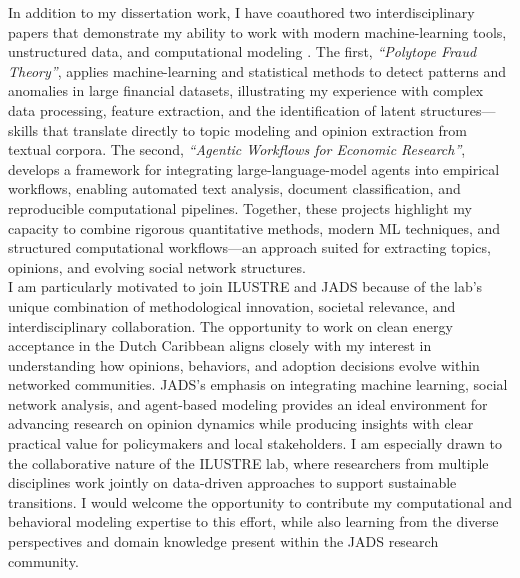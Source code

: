 \documentclass{nfr}
\begin{document}
In addition to my dissertation work, I have coauthored two interdisciplinary papers that demonstrate my ability to work with modern machine-learning tools, unstructured data, and computational modeling \citep{Zhao2025, Dawid2025}. 
The first, \textit{“Polytope Fraud Theory”}, applies machine-learning and statistical methods to detect patterns and anomalies in large financial datasets, illustrating my experience with complex data processing, feature extraction, and the identification of latent structures—skills that translate directly to topic modeling and opinion extraction from textual corpora. 
The second, \textit{“Agentic Workflows for Economic Research”}, develops a framework for integrating large-language-model agents into empirical workflows, enabling automated text analysis, document classification, and reproducible computational pipelines. 
Together, these projects highlight my capacity to combine rigorous quantitative methods, modern ML techniques, and structured computational workflows—an approach suited for extracting topics, opinions, and evolving social network structures.\\

I am particularly motivated to join ILUSTRE and JADS because of the lab’s unique combination of methodological innovation, societal relevance, and interdisciplinary collaboration. 
The opportunity to work on clean energy acceptance in the Dutch Caribbean aligns closely with my interest in understanding how opinions, behaviors, and adoption decisions evolve within networked communities. 
JADS’s emphasis on integrating machine learning, social network analysis, and agent-based modeling provides an ideal environment for advancing research on opinion dynamics while producing insights with clear practical value for policymakers and local stakeholders. 
I am especially drawn to the collaborative nature of the ILUSTRE lab, where researchers from multiple disciplines work jointly on data-driven approaches to support sustainable transitions. 
I would welcome the opportunity to contribute my computational and behavioral modeling expertise to this effort, while also learning from the diverse perspectives and domain knowledge present within the JADS research community.\\
\end{document}
